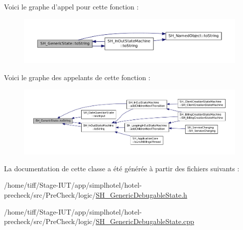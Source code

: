 Voici le graphe d'appel pour cette fonction \-:\nopagebreak
\begin{figure}[H]
\begin{center}
\leavevmode
\includegraphics[width=350pt]{classSH__GenericState_a5480c5ee725fd801d8f6292cd4c803b8_cgraph}
\end{center}
\end{figure}




Voici le graphe des appelants de cette fonction \-:\nopagebreak
\begin{figure}[H]
\begin{center}
\leavevmode
\includegraphics[width=350pt]{classSH__GenericState_a5480c5ee725fd801d8f6292cd4c803b8_icgraph}
\end{center}
\end{figure}




La documentation de cette classe a été générée à partir des fichiers suivants \-:\begin{DoxyCompactItemize}
\item 
/home/tiff/\-Stage-\/\-I\-U\-T/app/simplhotel/hotel-\/precheck/src/\-Pre\-Check/logic/\hyperlink{SH__GenericDebugableState_8h}{S\-H\-\_\-\-Generic\-Debugable\-State.\-h}\item 
/home/tiff/\-Stage-\/\-I\-U\-T/app/simplhotel/hotel-\/precheck/src/\-Pre\-Check/logic/\hyperlink{SH__GenericDebugableState_8cpp}{S\-H\-\_\-\-Generic\-Debugable\-State.\-cpp}\end{DoxyCompactItemize}

